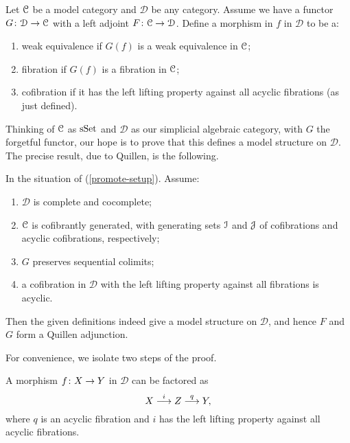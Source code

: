 \renewcommand{\D}{\mathcal{D}}

\begin{nothing}
  \label{promote-setup}
  Let $\mathcal{C}$ be a model category and $\D$ be any category. Assume we
  have a functor $G \c \D \to \C$ with a left adjoint $F \c \C \to
  \D$. Define a morphism in $f$ in $\D$ to be a:
  \begin{enumerate}
  \item weak equivalence if $G(f)$ is a weak equivalence in $\mathcal{C}$;
  \item fibration if $G(f)$ is a fibration in $\mathcal{C}$;
  \item cofibration if it has the left lifting property against all
    acyclic fibrations (as just defined).
  \end{enumerate}
  Thinking of $\mathcal{C}$ as $\mathrm{s}\mathrm{Set}$ and $\D$ as our simplicial algebraic
  category, with $G$ the forgetful functor, our hope is to prove that
  this defines a model structure on $\D$. The precise result, due to
  Quillen, is the following.
\end{nothing}

\begin{theorem}
  \label{promote-thm}
  In the situation of (\ref{promote-setup}). Assume:
  \begin{enumerate}
  \item $\D$ is complete and cocomplete;
  \item $\mathcal{C}$ is cofibrantly generated, with generating sets $\mathcal{I}$ and
    $\mathcal{J}$ of cofibrations and acyclic cofibrations, respectively;
  \item \label{seqcolim} $G$ preserves sequential colimits;
  \item \label{accof} a cofibration in $\D$ with the left lifting
    property against all fibrations is acyclic.
  \end{enumerate}
  Then the given definitions indeed give a model structure on $\D$,
  and hence $F$ and $G$ form a Quillen adjunction.
\end{theorem}

For convenience, we isolate two steps of the proof.

\begin{lemma}
  \label{factor1}
  A morphism $f \colon X \to Y$ in $\D$ can be factored as
  \[
  X \overset{i}{\longrightarrow} Z \overset{q}{\longrightarrow} Y,
  \]
  where $q$ is an acyclic fibration and $i$ has the left lifting
  property against all acyclic fibrations.
\end{lemma}

